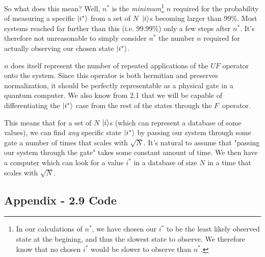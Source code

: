 \documentclass[12p,a4paper]{article}
\newcommand{\0}{\ket{0}}
\newcommand{\1}{\ket{1}}
\begin{document}
So what does this mean? Well, $n^*$ is the \textit{minimum}\footnote{In our calculations of $n^*$, we have chosen our $i^*$ to be the least likely observed state at the begining, and thus the slowest state to observe. We therefore know that no chosen $i^*$ would be slower to observe than $n^*$.} $n$ required for the probability of measuring a specific  $\ket{i^*}$ from a set of $N$ $\ket{i}$s becoming larger than 99\%. Most systems reached far further than this (i.e. 99.99\%) only a few steps after $n^*$. It's therefore not unreasonable to simply consider $n^*$ the number $n$ required for actually observing our chosen state $\ket{i^*}$.

$n$ does itself represent the number of repeated applications of the $UF$ operator onto the system. Since this operator is both hermitian and preserves normalization, it should be perfectly representable as a physical gate in a quantum computer. We also know from 2.1 that we will be capable of differentiating the $\ket{i^*}$ case from the rest of the states through the $F$ operator.

This means that for a set of $N$ $\ket{i}$s (which can represent a database of some values), we can find \textit{any} specific state $\ket{i^*}$ by passing our system through some gate a number of times that scales with $\sqrt{N}$. It's natural to assume that "passing our system through the gate" takes some constant amount of time. We then have a computer which can look for a value $i^*$ in a database of size $N$ in a time that scales with $\sqrt{N}$.



\subsection*{Appendix - 2.9 Code}

\end{document}
